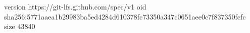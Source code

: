 version https://git-lfs.github.com/spec/v1
oid sha256:5771aaea1b29983ba5ed4284d610378fc73350a347c0651aee0c7f837350fcfc
size 43840
